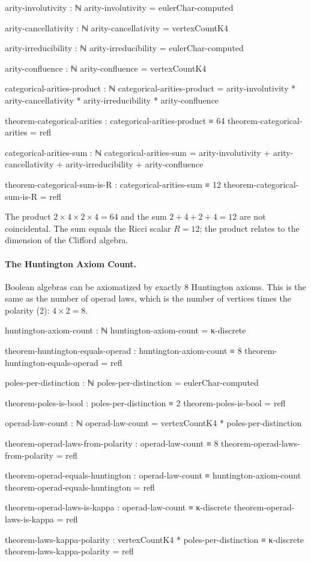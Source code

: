 \documentclass[11pt,a4paper]{book}
\begin{document}
\begin{code}
arity-involutivity : ℕ
arity-involutivity = eulerChar-computed

arity-cancellativity : ℕ
arity-cancellativity = vertexCountK4

arity-irreducibility : ℕ
arity-irreducibility = eulerChar-computed

arity-confluence : ℕ
arity-confluence = vertexCountK4

categorical-arities-product : ℕ
categorical-arities-product = arity-involutivity * arity-cancellativity 
                            * arity-irreducibility * arity-confluence

theorem-categorical-arities : categorical-arities-product ≡ 64
theorem-categorical-arities = refl

categorical-arities-sum : ℕ
categorical-arities-sum = arity-involutivity + arity-cancellativity 
                        + arity-irreducibility + arity-confluence

theorem-categorical-sum-is-R : categorical-arities-sum ≡ 12
theorem-categorical-sum-is-R = refl
\end{code}

The product $2 \times 4 \times 2 \times 4 = 64$ and the sum $2 + 4 + 2 + 4 = 12$ are not 
coincidental. The sum equals the Ricci scalar $R = 12$; the product relates to the 
dimension of the Clifford algebra.

\paragraph{The Huntington Axiom Count.}
Boolean algebras can be axiomatized by exactly 8 Huntington axioms. This is the same 
as the number of operad laws, which is the number of vertices times the polarity (2):
$4 \times 2 = 8$.

\begin{code}
huntington-axiom-count : ℕ
huntington-axiom-count = κ-discrete

theorem-huntington-equals-operad : huntington-axiom-count ≡ 8
theorem-huntington-equals-operad = refl

poles-per-distinction : ℕ
poles-per-distinction = eulerChar-computed

theorem-poles-is-bool : poles-per-distinction ≡ 2
theorem-poles-is-bool = refl

operad-law-count : ℕ
operad-law-count = vertexCountK4 * poles-per-distinction

theorem-operad-laws-from-polarity : operad-law-count ≡ 8
theorem-operad-laws-from-polarity = refl

theorem-operad-equals-huntington : operad-law-count ≡ huntington-axiom-count
theorem-operad-equals-huntington = refl

theorem-operad-laws-is-kappa : operad-law-count ≡ κ-discrete
theorem-operad-laws-is-kappa = refl

theorem-laws-kappa-polarity : vertexCountK4 * poles-per-distinction ≡ κ-discrete
theorem-laws-kappa-polarity = refl
\end{code}
\end{document}
